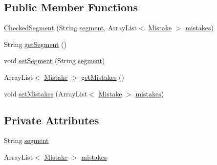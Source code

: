 \subsection*{Public Member Functions}
\begin{DoxyCompactItemize}
\item 
\hyperlink{classbr_1_1usp_1_1cata_1_1model_1_1_checked_segment_a4febf1ef855ab5a8df83e98dbbdfed95}{Checked\+Segment} (String \hyperlink{classbr_1_1usp_1_1cata_1_1model_1_1_checked_segment_ad8012b562129876b671d84e964a86654}{segment}, Array\+List$<$ \hyperlink{classbr_1_1usp_1_1cata_1_1model_1_1_mistake}{Mistake} $>$ \hyperlink{classbr_1_1usp_1_1cata_1_1model_1_1_checked_segment_a6b25977a722df2005bfa50f328e0e2db}{mistakes})
\item 
String \hyperlink{classbr_1_1usp_1_1cata_1_1model_1_1_checked_segment_a60e90a84b67eb1db44cabb4e3350e432}{get\+Segment} ()
\item 
void \hyperlink{classbr_1_1usp_1_1cata_1_1model_1_1_checked_segment_ad342ff836c30e34989ee902e28e5b006}{set\+Segment} (String \hyperlink{classbr_1_1usp_1_1cata_1_1model_1_1_checked_segment_ad8012b562129876b671d84e964a86654}{segment})
\item 
Array\+List$<$ \hyperlink{classbr_1_1usp_1_1cata_1_1model_1_1_mistake}{Mistake} $>$ \hyperlink{classbr_1_1usp_1_1cata_1_1model_1_1_checked_segment_aaf0b27941bc26fe860552246b1976ede}{get\+Mistakes} ()
\item 
void \hyperlink{classbr_1_1usp_1_1cata_1_1model_1_1_checked_segment_a5808b28c8c1b7691e94e5530fc394e66}{set\+Mistakes} (Array\+List$<$ \hyperlink{classbr_1_1usp_1_1cata_1_1model_1_1_mistake}{Mistake} $>$ \hyperlink{classbr_1_1usp_1_1cata_1_1model_1_1_checked_segment_a6b25977a722df2005bfa50f328e0e2db}{mistakes})
\end{DoxyCompactItemize}
\subsection*{Private Attributes}
\begin{DoxyCompactItemize}
\item 
String \hyperlink{classbr_1_1usp_1_1cata_1_1model_1_1_checked_segment_ad8012b562129876b671d84e964a86654}{segment}
\item 
Array\+List$<$ \hyperlink{classbr_1_1usp_1_1cata_1_1model_1_1_mistake}{Mistake} $>$ \hyperlink{classbr_1_1usp_1_1cata_1_1model_1_1_checked_segment_a6b25977a722df2005bfa50f328e0e2db}{mistakes}
\end{DoxyCompactItemize}


